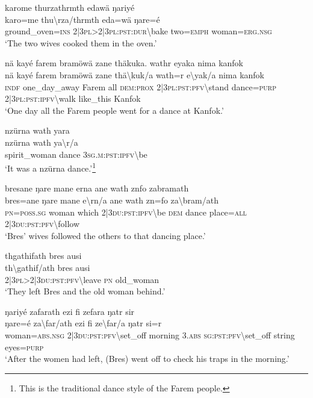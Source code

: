 \ea\label{ex:8:a1676}
karome thurzathrmth edawä ŋariyé\\
\gll karo=me	thu{\textbackslash}rza/thrmth	eda=wä	ŋare=é\\
     ground\_oven=\textsc{ins}	2|3\textsc{pl}>2|3\textsc{pl}:\textsc{pst}:\textsc{dur}{\textbackslash}bake	two=\textsc{emph}	woman=\textsc{erg}.\textsc{nsg}\\
\glt `The two wives cooked them in the oven.'
\z

\ea\label{ex:8:a1678}
nä kayé farem bramöwä zane thäkuka. wathr eyaka nima kanfok\\
\gll nä	kayé	farem	bramöwä	zane	thä{\textbackslash}kuk/a	wath=r	e{\textbackslash}yak/a	nima	kanfok\\
     \textsc{indf}	one\_day\_away	Farem	all	\textsc{dem}:\textsc{prox}	2|3\textsc{pl}:\textsc{pst}:\textsc{pfv}{\textbackslash}stand	dance=\textsc{purp}	2|3\textsc{pl}:\textsc{pst}:\textsc{ipfv}{\textbackslash}walk	like\_this	Kanfok\\
\glt `One day all the Farem people went for a dance at Kanfok.'
\z

\ea\label{ex:8:a1681}
nzürna wath yara\\
\gll nzürna	wath	ya{\textbackslash}r/a\\
     spirit\_woman	dance	3\textsc{sg}.\textsc{m}:\textsc{pst}:\textsc{ipfv}{\textbackslash}be\\
\glt `It was a nzürna dance.'\footnote{This is the traditional dance style of the Farem people.}
\z

\ea\label{ex:8:a1682}
bresane ŋare mane erna ane wath znfo zabramath\\
\gll bres=ane	ŋare	mane	e{\textbackslash}rn/a	ane	wath	zn=fo	za{\textbackslash}bram/ath\\
     \textsc{pn}=\textsc{poss}.\textsc{sg}	woman	which	2|3\textsc{du}:\textsc{pst}:\textsc{ipfv}{\textbackslash}be	\textsc{dem}	dance	place=\textsc{all}	2|3\textsc{du}:\textsc{pst}:\textsc{pfv}{\textbackslash}follow\\
\glt `Bres' wives followed the others to that dancing place.'
\z

\ea\label{ex:8:a1684}
thgathifath bres ausi\\
\gll th{\textbackslash}gathif/ath	bres	ausi\\
     2|3\textsc{pl}>2|3\textsc{du}:\textsc{pst}:\textsc{pfv}{\textbackslash}leave	\textsc{pn}	old\_woman\\
\glt `They left Bres and the old woman behind.'
\z

\ea\label{ex:8:a1686}
ŋariyé zafarath ezi fi zefara ŋatr sir\\
\gll ŋare=é	za{\textbackslash}far/ath	ezi	fi	ze{\textbackslash}far/a	ŋatr	si=r\\
     woman=\textsc{abs}.\textsc{nsg}	2|3\textsc{du}:\textsc{pst}:\textsc{pfv}{\textbackslash}set\_off	morning	3.\textsc{abs}	\textsc{sg}:\textsc{pst}:\textsc{pfv}{\textbackslash}set\_off	string	eyes=\textsc{purp}\\
\glt `After the women had left, (Bres) went off to check his traps in the morning.'
\z

